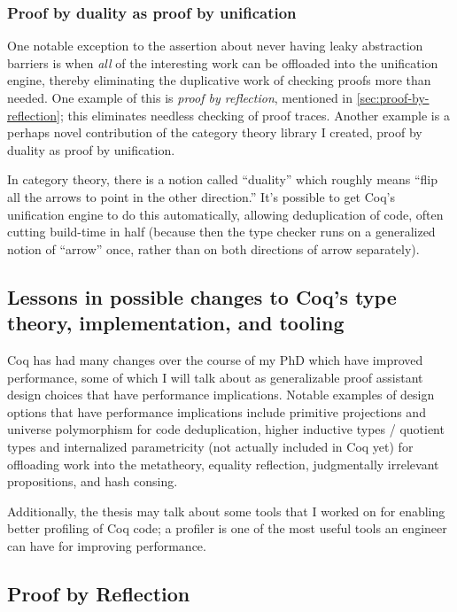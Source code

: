 \documentclass[twoside]{article}
\begin{document}
{\subsubsection{Proof by duality as proof by unification}
One notable exception to the assertion about never having leaky abstraction barriers is when \emph{all} of the interesting work can be offloaded into the unification engine, thereby eliminating the duplicative work of checking proofs more than needed.
One example of this is \emph{proof by reflection}, mentioned in \autoref{sec:proof-by-reflection}; this eliminates needless checking of proof traces.
Another example is a perhaps novel contribution of the category theory library I created, proof by duality as proof by unification.

In category theory, there is a notion called ``duality'' which roughly means ``flip all the arrows to point in the other direction.''
It's possible to get Coq's unification engine to do this automatically, allowing deduplication of code, often cutting build-time in half (because then the type checker runs on a generalized notion of ``arrow'' once, rather than on both directions of arrow separately).

\subsection{Lessons in possible changes to Coq's type theory, implementation, and tooling}

Coq has had many changes over the course of my PhD which have improved performance, some of which I will talk about as generalizable proof assistant design choices that have performance implications.
Notable examples of design options that have performance implications include primitive projections and universe polymorphism for code deduplication, higher inductive types / quotient types and internalized parametricity (not actually included in Coq yet) for offloading work into the metatheory, equality reflection, judgmentally irrelevant propositions, and hash consing.

Additionally, the thesis may talk about some tools that I worked on for enabling better profiling of Coq code; a profiler is one of the most useful tools an engineer can have for improving performance.

\subsection{Proof by Reflection} \label{sec:proof-by-reflection}

}
\end{document}
